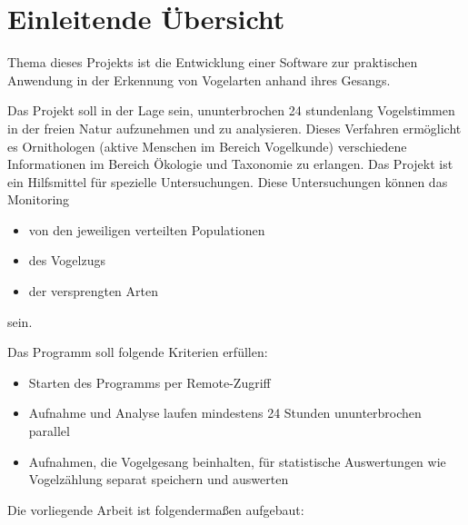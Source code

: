 \section{Einleitende Übersicht%
         \label{sec:Einleitung}}

Thema dieses Projekts ist die Entwicklung einer Software zur praktischen Anwendung in der Erkennung von Vogelarten anhand ihres Gesangs.

Das Projekt soll in der Lage sein, ununterbrochen 24 stundenlang Vogelstimmen in der freien Natur aufzunehmen und zu analysieren. Dieses Verfahren ermöglicht es Ornithologen (aktive Menschen im Bereich Vogelkunde) verschiedene Informationen im Bereich Ökologie und Taxonomie zu erlangen. Das Projekt ist ein Hilfsmittel für spezielle Untersuchungen. Diese Untersuchungen können das Monitoring

\begin{itemize}

\item von den jeweiligen verteilten Populationen

\item des Vogelzugs

\item der versprengten Arten

\end{itemize}

sein.\bigskip

Das Programm soll folgende Kriterien erfüllen:

\begin{itemize}

\item Starten des Programms per Remote-Zugriff

\item Aufnahme und Analyse laufen mindestens 24 Stunden ununterbrochen parallel

\item Aufnahmen, die Vogelgesang beinhalten, für statistische Auswertungen wie Vogelzählung separat speichern und auswerten

\end{itemize}
\bigskip

Die vorliegende Arbeit ist folgendermaßen aufgebaut:

